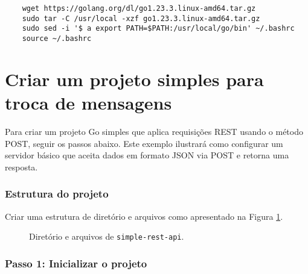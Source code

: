 \begin{verbatim}
    wget https://golang.org/dl/go1.23.3.linux-amd64.tar.gz
    sudo tar -C /usr/local -xzf go1.23.3.linux-amd64.tar.gz
    sudo sed -i '$ a export PATH=$PATH:/usr/local/go/bin' ~/.bashrc
    source ~/.bashrc
\end{verbatim}

\section{Criar um projeto simples para troca de mensagens}

Para criar um projeto Go simples que aplica requisições REST usando o método POST, seguir os passos abaixo. Este exemplo ilustrará como configurar um servidor básico que aceita dados em formato JSON via POST e retorna uma resposta.

\subsubsection{Estrutura do projeto}
Criar uma estrutura de diretório e arquivos como apresentado na Figura \ref{fig:estrutura-simple-rest-api}.

\begin{figure}[h!]%
    \centering
\caption{Diretório e arquivos de \texttt{simple-rest-api}.}
\label{fig:estrutura-simple-rest-api}
\end{figure}%


\subsubsection{Passo 1: Inicializar o projeto}

